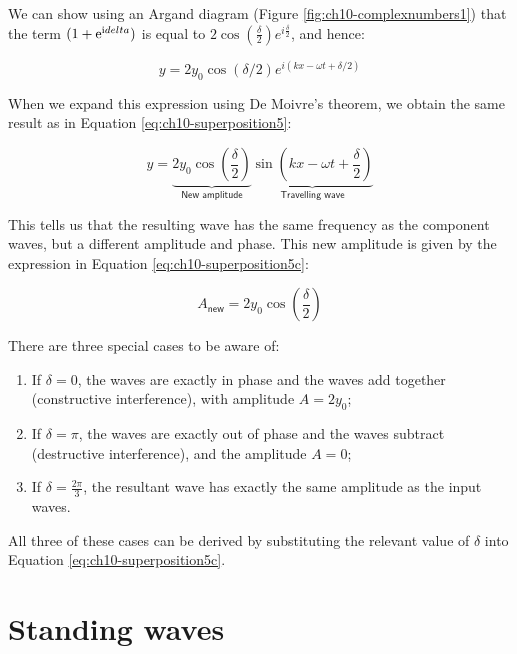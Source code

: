 \documentclass[
]{book}
\providecommand{\tightlist}{%
  \setlength{\itemsep}{0pt}\setlength{\parskip}{0pt}}
\begin{document}
We can show using an Argand diagram (Figure \ref{fig:ch10-complexnumbers1}) that the term \((1 + \mathrm{e}^{\mathrm{i}\\delta})\) is equal to \(2\cos \left(\frac{\delta}{2}\right)e^{i\frac{\delta}{2}}\), and hence:

\begin{equation}
y = 2y_0 \cos(\delta/2) e^{i(kx-\omega t + \delta/2)}
\end{equation}

When we expand this expression using De Moivre's theorem, we obtain the same result as in Equation \eqref{eq:ch10-superposition5}:

\begin{equation}
y = \underbrace{2 y_0 \cos \left( \frac{\delta}{2} \right)}_{\textsf{New amplitude}} \underbrace{\sin \left( kx - \omega t + \frac{\delta}{2} \right)}_{\textsf{Travelling wave}}
\label{eq:ch10-superposition5b} 
\end{equation}

This tells us that the resulting wave has the same frequency as the component waves, but a different amplitude and phase. This new amplitude is given by the expression in Equation \eqref{eq:ch10-superposition5c}:

\begin{equation}
A_{\textsf{new}} = 2 y_0 \cos \left( \frac{\delta}{2} \right)
\label{eq:ch10-superposition5c} 
\end{equation}

There are three special cases to be aware of:

\begin{enumerate}
\def\labelenumi{\arabic{enumi}.}
\tightlist
\item
  If \(\delta = 0\), the waves are exactly in phase and the waves add together (constructive interference), with amplitude \(A = 2 y_0\);
\item
  If \(\delta = \pi\), the waves are exactly out of phase and the waves subtract (destructive interference), and the amplitude \(A = 0\);
\item
  If \(\delta = \frac{2\pi}{3}\), the resultant wave has exactly the same amplitude as the input waves.
\end{enumerate}

All three of these cases can be derived by substituting the relevant value of \(\delta\) into Equation \eqref{eq:ch10-superposition5c}.

\hypertarget{sec:ch10-standingwaves1}{%
\section{Standing waves}\label{sec:ch10-standingwaves1}}
\end{document}
